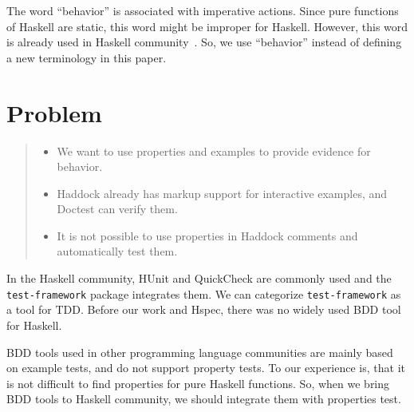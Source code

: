 \documentclass[preprint]{sigplanconf}
\begin{document}
The word ``behavior'' is associated with imperative actions.
Since pure functions of Haskell are static,
this word might be improper for Haskell.
However, this word is already used in Haskell community~\cite{typeclassopedia}.
So, we use ``behavior'' instead of defining a new terminology in this paper.



\section{Problem}

\begin{quote}\begin{itemize}
    \item
        We want to use properties and examples to provide evidence for
        behavior.
    \item
        Haddock already has markup support for interactive examples,
        and Doctest can verify them.
    \item
        It is not possible to use properties in Haddock comments and
        automatically test them.
\end{itemize}\end{quote}

In the Haskell community, HUnit and QuickCheck are commonly used %
and the {\tt test-framework} package integrates them.
We can categorize {\tt test-framework} as
a tool for TDD.
Before our work and Hspec, there was no widely used BDD tool for Haskell.

BDD tools used in other programming language communities are
mainly based on example tests,
and do not support property tests.
To our experience is, that it is not difficult to find properties for
pure Haskell functions.
So, when we bring BDD tools to
Haskell community, we should integrate them with properties test.
\end{document}
